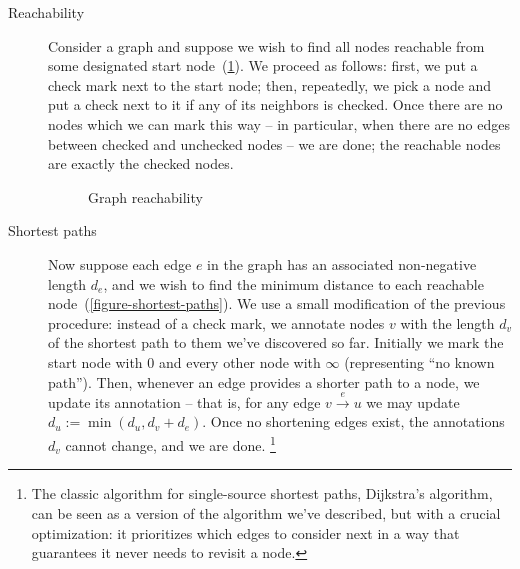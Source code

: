 \begin{description}


\item[Reachability] %
%
Consider a graph and suppose we wish to find all nodes reachable from some
designated start node~(\cref{figure-reachability}). We proceed as follows:
first, we put a check mark next to the start node; then, repeatedly, we pick a
node and put a check next to it if any of its neighbors is checked. Once there
are no nodes which we can mark this way -- in particular, when there are no
edges between checked and unchecked nodes -- we are done; the reachable nodes
are exactly the checked nodes.



\begin{figure}[pth]
  \centering
  \caption{Graph reachability}
  \label{figure-reachability}
\end{figure}


\item[Shortest paths]
%
Now suppose each edge $e$ in the graph has an associated non-negative length
$d_e$, and we wish to find the minimum distance to each reachable
node~(\cref{figure-shortest-paths}). We use a small modification of the previous
procedure: instead of a check mark, we annotate nodes $v$ with the length $d_v$
of the shortest path to them we've discovered so far. Initially we mark the
start node with 0 and every other node with $\infty$ (representing ``no known
path'').
%
%
%
Then, whenever an edge provides a shorter path to a node, we update its
annotation -- that is, for any edge $v \xrightarrow{e} u$ we may update $d_u :=
\min(d_u, d_v + d_e)$.
%
Once no shortening edges exist, the annotations $d_v$ cannot change, and we are done.%
%
%
\footnote{The classic algorithm for single-source shortest paths, Dijkstra's
  algorithm, can be seen as a version of the algorithm we've described, but with
  a crucial optimization: it prioritizes which edges to consider next in a
  way that guarantees it never needs to revisit a node.}


\end{description}
